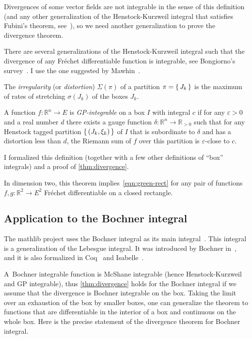 \documentclass[a4paper, UKenglish,cleveref, autoref, thm-restate]{lipics-v2021}
\newcommand{\bbR}{\mathbb{R}}
\newcommand{\eps}{\varepsilon}
\begin{document}
Divergences of some vector fields are not integrable in the sense of
this definition (and any other generalization of the Henstock-Kurzweil
integral that satisfies Fubini's theorem, see~\cite{Pfeffer93}), so we
need another generalization to prove the divergence theorem.

There are several generalizations of the Henstock-Kurzweil integral
such that the divergence of any Fréchet differentiable function is
integrable, see Bongiorno's survey~\cite{BONGIORNO2002587}.  I use the
one suggested by Mawhin~\cite{Mawhin81}.

\begin{definition}%
  \label{def:GP-integral}
  The \emph{irregularity} (or \emph{distortion}) \(\Sigma(\pi)\) of a
  partition \(\pi=\set{J_{k}}\) is the maximum of rates of stretching
  \(\sigma(J_{k})\) of the boxes \(J_{k}\).

  A function \(f\colon \bbR^{n}\to E\) is \emph{GP-integrable} on a
  box \(I\) with integral \(c\) if for any \(\eps>0\) and a real
  number \(d\) there exists a gauge function
  \(\delta\colon \bbR^{n}\to \bbR_{>0}\) such that for any Henstock
  tagged partition \(\set{(J_{k}, \xi_{k})}\) of \(I\) that is
  subordinate to \(\delta\) and has a distortion less than \(d\), the
  Riemann sum of \(f\) over this partition is \(\eps\)-close to \(c\).
\end{definition}

I formalized this definition (together with a few other definitions of
“box” integrals) and a proof of \autoref{thm:divergence}.

In dimension two, this theorem implies~\eqref{eqn:green-rect} for any
pair of functions \(f, g \colon \bbR^{2}\to E^{2}\) Fréchet
differentiable on a closed rectangle.

\subsection{Application to the Bochner integral}

The mathlib project uses the Bochner integral as its main
integral~\cite{vandoorn:LIPIcs.ITP.2021.18}. This integral is a
generalization of the Lebesgue integral. It was introduced by Bochner
in~\cite{Bochner1933IntegrationVF}, and it is also formalized in
Coq~\cite{boldo2022coq} and Isabelle~\cite{Avigad17}.

A~Bochner integrable function is McShane integrable (hence
Henstock-Kurzweil and GP integrable), thus \autoref{thm:divergence}
holds for the Bochner integral if we assume that the divergence is
Bochner integrable on the box. Taking the limit over an exhaustion of
the box by smaller boxes, one can generalize the theorem to functions
that are differentiable in the interior of a box and continuous on the
whole box. Here is the precise statement of the divergence theorem for
Bochner integral.
\end{document}
